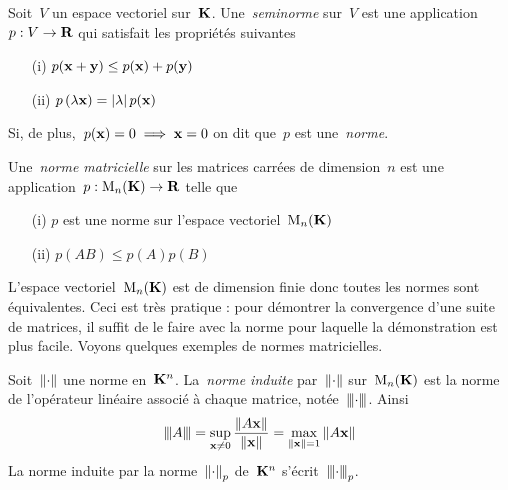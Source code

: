 
\begin{definition}[norme]
	Soit~$V$ un espace vectoriel sur~$\mathbf{K}$.
	Une~\emph{seminorme} sur~$V$ est une application~$p:V\to\mathbf{R}$
	qui satisfait les propriétés suivantes
	\begin{enumerate}
		\item[(i)] $p(\mathbf{x}+\mathbf{y})\le p(\mathbf{x})+p(\mathbf{y})$
		\item[(ii)] $p\left(\lambda\mathbf{x}\right)=\left|\lambda\right|p(\mathbf{x})$
	\end{enumerate}
	Si, de plus,~$p(\mathbf{x})=0\implies\mathbf{x}=0$ on dit que~$p$ est une~\emph{norme}.
\end{definition}

\begin{definition}
	Une~\emph{norme matricielle} sur les matrices carrées de dimension~$n$ est
	une application~$p:\mathrm{M}_n(\mathbf{K})\to\mathbf{R}$ telle que
	\begin{enumerate}
		\item[(i)] $p$ est une norme sur l'espace vectoriel~$\mathrm{M}_n(\mathbf{K})$
		\item[(ii)] $p(AB) \le p(A) p(B)$
	\end{enumerate}
\end{definition}

L'espace vectoriel~$\mathrm{M}_n(\mathbf{K})$ est de dimension finie donc toutes les normes
sont équivalentes.  Ceci est très pratique : pour démontrer la convergence
d'une suite de matrices, il suffit de le faire avec la norme pour laquelle la
démonstration est plus facile.  Voyons quelques exemples de normes
matricielles.


\begin{definition}
	Soit~$\left\|\cdot\right\|$ une norme en~$\mathbf{K}^n$.  La~\emph{norme induite}
	par~$\left\|\cdot\right\|$ sur~$\mathrm{M}_n(\mathbf{K})$ est la norme de l'opérateur
	linéaire %
	associé à chaque matrice, notée~${\left\vert\kern-0.25ex\left\vert\kern-0.25ex\left\vert \cdot \right\vert\kern-0.25ex\right\vert\kern-0.25ex\right\vert}$.  Ainsi
	\[
		{\left\vert\kern-0.25ex\left\vert\kern-0.25ex\left\vert A \right\vert\kern-0.25ex\right\vert\kern-0.25ex\right\vert}
		=
		\sup_{\mathbf{x}\neq0}\frac{\left\|A\mathbf{x}\right\|}{\left\|\mathbf{x}\right\|}
		=
		\max_{\left\|\mathbf{x}\right\|=1}\left\|A\mathbf{x}\right\|
	\]
	La norme induite par la norme~$\left\|\cdot\right\|_p$ de~$\mathbf{K}^n$
	s'écrit~${\left\vert\kern-0.25ex\left\vert\kern-0.25ex\left\vert \cdot \right\vert\kern-0.25ex\right\vert\kern-0.25ex\right\vert}_p$.
\end{definition}

